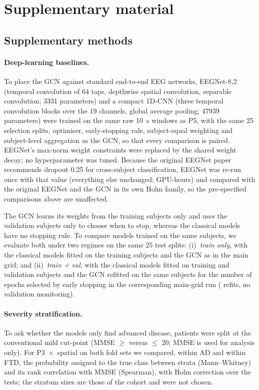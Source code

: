 \appendix
\section*{Supplementary material}

\subsection*{Supplementary methods}
\paragraph{Deep-learning baselines.} To place the GCN against standard end-to-end EEG networks, EEGNet-8,2
\cite{F14} (temporal convolution of 64 taps, depthwise spatial convolution, separable convolution;
\num{3331} parameters) and a compact 1D-CNN (three temporal convolution blocks over the 19 channels,
global average pooling; \num{47939} parameters) were trained on the same raw \SI{10}{\second} windows
as P5, with the same 25 selection splits, optimiser, early-stopping rule, subject-equal weighting and
subject-level aggregation as the GCN, so that every comparison is paired. EEGNet's max-norm weight
constraints were replaced by the shared weight decay; no hyperparameter was tuned. Because the original
EEGNet paper recommends dropout 0.25 for cross-subject classification, EEGNet was re-run once with that
value (everything else unchanged; \dropGpuHours{} GPU-hours) and compared with the original EEGNet and the
GCN in its own Holm family, so the pre-specified comparisons above are unaffected.

The GCN learns its weights from the training subjects only and uses the validation subjects only to
choose when to stop, whereas the classical models have no stopping rule. To compare models trained
on the same subjects, we evaluate both under two regimes on the same 25 test splits:
(i)~\emph{train only}, with the classical models fitted on the training subjects and the GCN as in the
main grid; and (ii)~\emph{train + val}, with the classical models fitted on training and validation
subjects and the GCN refitted on the same subjects for the number of epochs selected by early
stopping in the corresponding main-grid run (\nRefitRuns{} refits, no validation monitoring).

\paragraph{Severity stratification.} To ask whether the models only find advanced disease, patients were split
at the conventional mild cut-point (MMSE $\ge$ \sevMildMin{} versus $\le$ 20; MMSE is used for analysis only).
For P3~$\times$~spatial on both fold sets we compared, within AD and within FTD, the probability assigned to
the true class between strata (Mann--Whitney) and its rank correlation with MMSE (Spearman), with Holm
correction over the \sevNTests{} tests; the stratum sizes are those of the cohort and were not chosen.

